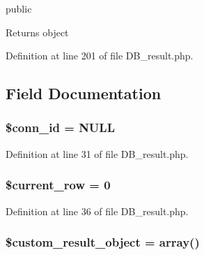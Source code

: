 public \begin{DoxyReturn}{Returns}
object 
\end{DoxyReturn}


Definition at line 201 of file D\-B\-\_\-result.\-php.



\subsection{Field Documentation}
\hypertarget{class_c_i___d_b__result_a16c23f1dcbfed2f2759f5e54f604106d}{
\subsubsection[{\$conn\-\_\-id}]{\setlength{\rightskip}{0pt plus 5cm}\$conn\-\_\-id = N\-U\-L\-L}}\label{class_c_i___d_b__result_a16c23f1dcbfed2f2759f5e54f604106d}


Definition at line 31 of file D\-B\-\_\-result.\-php.

\hypertarget{class_c_i___d_b__result_a2ec3a266ee95cda75cdbb71bc9ee1b53}{
\subsubsection[{\$current\-\_\-row}]{\setlength{\rightskip}{0pt plus 5cm}\$current\-\_\-row = 0}}\label{class_c_i___d_b__result_a2ec3a266ee95cda75cdbb71bc9ee1b53}


Definition at line 36 of file D\-B\-\_\-result.\-php.

\hypertarget{class_c_i___d_b__result_a680c2e11eeb189d9bb8ba2a552766b7b}{
\subsubsection[{\$custom\-\_\-result\-\_\-object}]{\setlength{\rightskip}{0pt plus 5cm}\${\bf custom\-\_\-result\-\_\-object} = array()}}\label{class_c_i___d_b__result_a680c2e11eeb189d9bb8ba2a552766b7b}


